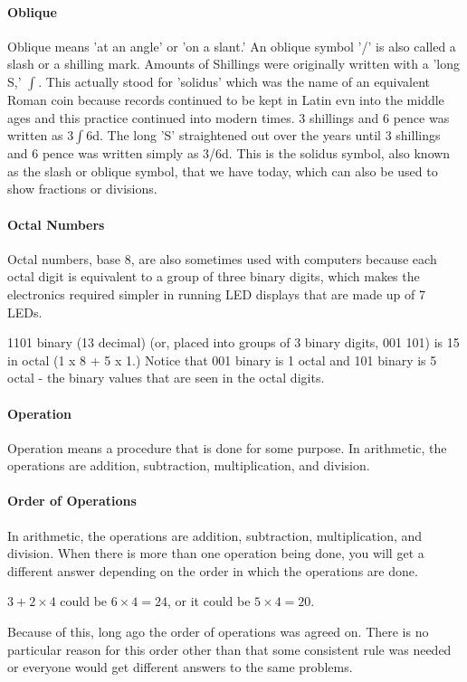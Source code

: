 \documentclass[12pt]{article}
\begin{document}
{\paragraph{Oblique}
Oblique means 'at an angle' or 'on a slant.' An oblique symbol '/' is also called a slash or a shilling mark. Amounts of Shillings were originally written with a 'long S,' $\int$. This actually stood for 'solidus' which was the name of an equivalent Roman coin because records continued to be kept in Latin evn into the middle ages and this practice continued into modern times. 3 shillings and 6 pence was written as 3$\int$6d. The long 'S' straightened out over the years until 3 shillings and 6 pence was written simply as 3/6d. This is the solidus symbol, also known as the slash or oblique symbol, that we have today, which can also be used to show fractions or divisions.

\paragraph{Octal Numbers}
Octal numbers, base 8, are also sometimes used with computers because each octal digit is equivalent to a group of three binary digits, which makes the electronics required simpler in running LED displays that are made up of 7 LEDs.

1101 binary (13 decimal) (or, placed into groups of 3 binary digits, 001 101) is 15 in octal (1 x 8 + 5 x 1.) Notice that 001 binary is 1 octal and 101 binary is 5 octal - the binary values that are seen in the octal digits.

\paragraph{Operation}
Operation means a procedure that is done for some purpose. In arithmetic, the operations are addition, subtraction, multiplication, and division.

\paragraph{Order of Operations}
In arithmetic, the operations are addition, subtraction, multiplication, and division. When there is more than one operation being done, you will get a different answer depending on the order in which the operations are done.

$3 + 2 \times 4$ could be $6 \times 4 = 24$, or it could be $5 \times 4 = 20$.

Because of this, long ago the order of operations was agreed on. There is no particular reason for this order other than that some consistent rule was needed or everyone would get different answers to the same problems.

}
\end{document}

